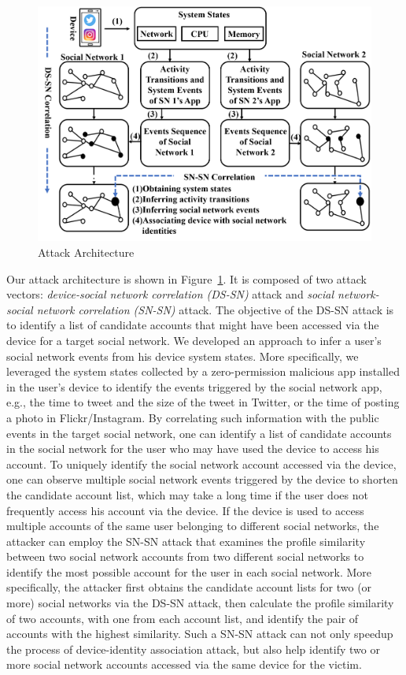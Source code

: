 \documentclass[letterpaper,12pt]{article}
\begin{document}
\begin{figure}[!htb]
  \centering
    \includegraphics[width=\textwidth]{overview.png}
    \caption{Attack Architecture}
    \label{fig:overall}
\end{figure}

Our attack architecture is shown in Figure~\ref{fig:overall}. It is composed of two attack vectors: \emph{device-social network correlation (DS-SN)} attack and \emph{social network-social network correlation (SN-SN)} attack. The objective of the DS-SN attack is to identify a list of candidate accounts that might have been accessed via the device for a target social network. We developed an approach to infer a user's social network events from his device system states. More specifically, we leveraged the system states collected by a zero-permission malicious app installed in the user's device to identify the events triggered by the social network app, e.g., the time to tweet and the size of the tweet in Twitter, or the time of posting a photo in Flickr/Instagram. By correlating such information with the public events in the target social network, one can identify a list of candidate accounts in the social network for the user who may have used the device to access his account. To uniquely identify the social network account accessed via the device, one can observe multiple social network events triggered by the device to shorten the candidate account list, which may take a long time if the user does not frequently access his account via the device. If the device is used to access multiple accounts of the same user belonging to different social networks, the attacker can employ the SN-SN attack that examines the profile similarity between two social network accounts from two different social networks to identify the most possible account for the user in each social network. More specifically, the attacker first obtains the candidate account lists for two (or more) social networks via the DS-SN attack, then calculate the profile similarity of two accounts, with one from each account list, and identify the pair of accounts with the highest similarity. Such a SN-SN attack can not only speedup the process of device-identity association attack, but also help identify two or more social network accounts accessed via the same device for the victim.
\end{document}
